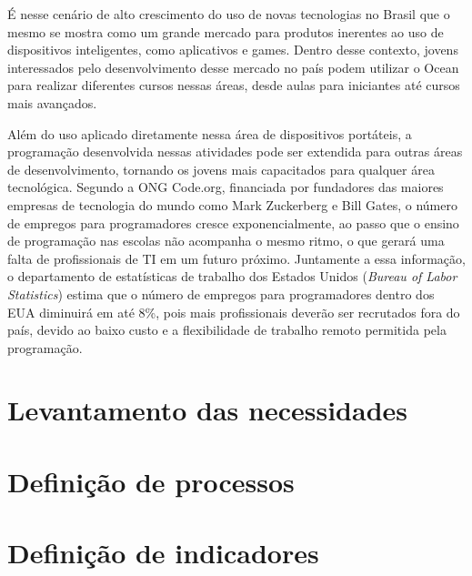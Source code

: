 É nesse cenário de alto crescimento do uso de novas tecnologias no Brasil que o mesmo se mostra como um grande mercado para produtos inerentes ao uso de dispositivos inteligentes, como aplicativos e games. Dentro desse contexto, jovens interessados pelo desenvolvimento desse mercado no país podem utilizar o Ocean para realizar diferentes cursos nessas áreas, desde aulas para iniciantes até cursos mais avançados.

Além do uso aplicado diretamente nessa área de dispositivos portáteis, a programação desenvolvida nessas atividades pode ser extendida para outras áreas de desenvolvimento, tornando os jovens mais capacitados para qualquer área tecnológica. Segundo a ONG Code.org, financiada por fundadores das maiores empresas de tecnologia do mundo como Mark Zuckerberg e Bill Gates, o número de empregos para programadores cresce exponencialmente, ao passo que o ensino de programação nas escolas não acompanha o mesmo ritmo, o que gerará uma falta de profissionais de TI em um futuro próximo. Juntamente a essa informação, o departamento de estatísticas de trabalho dos Estados Unidos (\textit{Bureau of Labor Statistics}) estima que o número de empregos para programadores dentro dos EUA diminuirá em até 8\%, pois mais profissionais deverão ser recrutados fora do país, devido ao baixo custo e a flexibilidade de trabalho remoto permitida pela programação. \cite{bls}

\section{Levantamento das necessidades} %
\label{sec:necessidades}

\section{Definição de processos} %
\label{sec:processos}

\section{Definição de indicadores} %
\label{sec:indicadores}